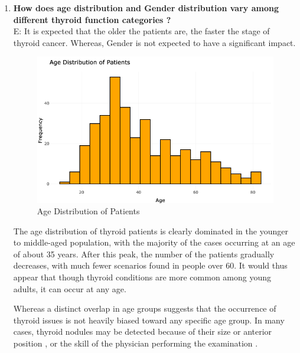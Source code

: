 \documentclass[12pt]{article}
\begin{document}
\begin{enumerate}
    \item \textbf{How does age distribution and Gender distribution vary among different thyroid function categories ?}\\
    E: It is expected that the older the patients are, the faster the stage of thyroid cancer. Whereas, Gender is not expected to have a significant impact.

    
    
    \begin{figure}[h]
        \centering
        \includegraphics[width=1\textwidth]{age dist.png}  
        \caption{Age Distribution of Patients}
            \label{fig:figure2}
       \vspace{0cm}
    \end{figure}

The age distribution of thyroid patients is clearly dominated in the younger to middle-aged population, with the majority of the cases occurring at an age of about 35 years. After this peak, the number of the patients gradually decreases, with much fewer scenarios found in people over 60. It would thus appear that though thyroid conditions are more common among young adults, it can occur at any age.


\hspace{9pt} Whereas a distinct overlap in age groups suggests that the occurrence of thyroid issues is not heavily biased toward any specific age group. In many cases, thyroid nodules may be detected because of their size or anterior position , or the skill of the physician performing the examination \citep{Vanderpump} .


\end{enumerate}
\end{document}
